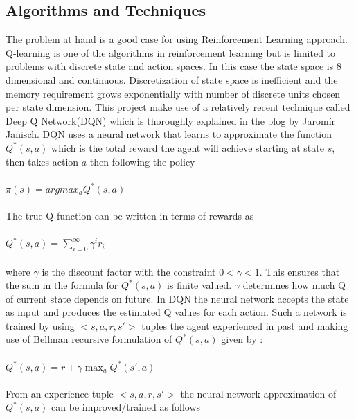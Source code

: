 \documentclass{svproc}
\begin{document}
\subsection*{Algorithms and Techniques}
The problem at hand is a good case for using Reinforcement Learning approach. Q-learning is one of the algorithms in reinforcement learning but is limited to problems with discrete state and action spaces. In this case the state space is 8 dimensional and continuous. Discretization of state space is inefficient and the memory requirement grows exponentially with number of discrete units chosen per state dimension. This project make use of a relatively recent technique called Deep Q Network(DQN)\cite{DQN} which is thoroughly explained in the blog by Jaromír Janisch\cite{Jaromir}. DQN uses a neural network that learns to approximate the function 
$Q^*(s, a)$ which is the total reward the agent will achieve starting at state $s$, then takes action $a$ then following the policy\\\\$\pi(s) = argmax_a Q^*(s, a)$\\\\
The true Q function can be written in terms of rewards as\\\\$Q^*(s, a) = \sum_{i=0}^{\infty} \gamma^i r_i$\\\\ where $\gamma$ is the discount factor with the constraint $0 < \gamma < 1$. This ensures that the sum in the formula for $Q^*(s, a)$ is finite valued. $\gamma$ determines how much Q of current state depends on future. In DQN the neural network accepts the state as input and produces the estimated Q values for each action. Such a network is trained by using $<s, a, r, s'>$ tuples the agent experienced in past and making use of Bellman recursive formulation of $Q^*(s, a)$ given by :\\\\
$Q^*(s, a) = r + \gamma \max_a Q^*(s', a)$\\\\
From an experience tuple $<s, a, r, s'>$ the neural network approximation of $Q^*(s,a)$ can be improved/trained as follows
\vspace{-0.09cm}
\end{document}
